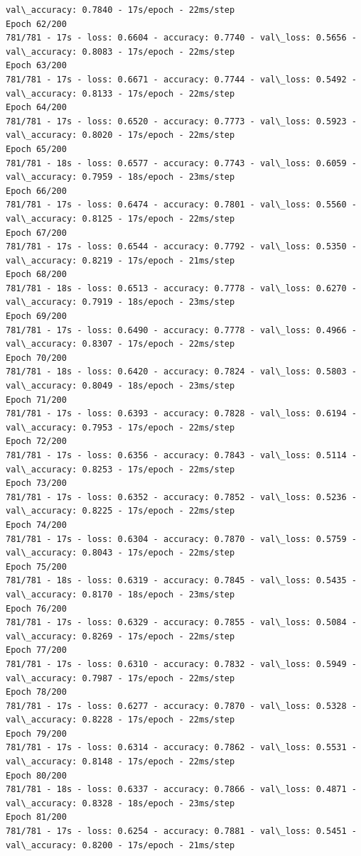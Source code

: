 \documentclass[11pt]{article}
\begin{document}
\begin{Verbatim}[commandchars=\\\{\}]
val\_accuracy: 0.7840 - 17s/epoch - 22ms/step
Epoch 62/200
781/781 - 17s - loss: 0.6604 - accuracy: 0.7740 - val\_loss: 0.5656 -
val\_accuracy: 0.8083 - 17s/epoch - 22ms/step
Epoch 63/200
781/781 - 17s - loss: 0.6671 - accuracy: 0.7744 - val\_loss: 0.5492 -
val\_accuracy: 0.8133 - 17s/epoch - 22ms/step
Epoch 64/200
781/781 - 17s - loss: 0.6520 - accuracy: 0.7773 - val\_loss: 0.5923 -
val\_accuracy: 0.8020 - 17s/epoch - 22ms/step
Epoch 65/200
781/781 - 18s - loss: 0.6577 - accuracy: 0.7743 - val\_loss: 0.6059 -
val\_accuracy: 0.7959 - 18s/epoch - 23ms/step
Epoch 66/200
781/781 - 17s - loss: 0.6474 - accuracy: 0.7801 - val\_loss: 0.5560 -
val\_accuracy: 0.8125 - 17s/epoch - 22ms/step
Epoch 67/200
781/781 - 17s - loss: 0.6544 - accuracy: 0.7792 - val\_loss: 0.5350 -
val\_accuracy: 0.8219 - 17s/epoch - 21ms/step
Epoch 68/200
781/781 - 18s - loss: 0.6513 - accuracy: 0.7778 - val\_loss: 0.6270 -
val\_accuracy: 0.7919 - 18s/epoch - 23ms/step
Epoch 69/200
781/781 - 17s - loss: 0.6490 - accuracy: 0.7778 - val\_loss: 0.4966 -
val\_accuracy: 0.8307 - 17s/epoch - 22ms/step
Epoch 70/200
781/781 - 18s - loss: 0.6420 - accuracy: 0.7824 - val\_loss: 0.5803 -
val\_accuracy: 0.8049 - 18s/epoch - 23ms/step
Epoch 71/200
781/781 - 17s - loss: 0.6393 - accuracy: 0.7828 - val\_loss: 0.6194 -
val\_accuracy: 0.7953 - 17s/epoch - 22ms/step
Epoch 72/200
781/781 - 17s - loss: 0.6356 - accuracy: 0.7843 - val\_loss: 0.5114 -
val\_accuracy: 0.8253 - 17s/epoch - 22ms/step
Epoch 73/200
781/781 - 17s - loss: 0.6352 - accuracy: 0.7852 - val\_loss: 0.5236 -
val\_accuracy: 0.8225 - 17s/epoch - 22ms/step
Epoch 74/200
781/781 - 17s - loss: 0.6304 - accuracy: 0.7870 - val\_loss: 0.5759 -
val\_accuracy: 0.8043 - 17s/epoch - 22ms/step
Epoch 75/200
781/781 - 18s - loss: 0.6319 - accuracy: 0.7845 - val\_loss: 0.5435 -
val\_accuracy: 0.8170 - 18s/epoch - 23ms/step
Epoch 76/200
781/781 - 17s - loss: 0.6329 - accuracy: 0.7855 - val\_loss: 0.5084 -
val\_accuracy: 0.8269 - 17s/epoch - 22ms/step
Epoch 77/200
781/781 - 17s - loss: 0.6310 - accuracy: 0.7832 - val\_loss: 0.5949 -
val\_accuracy: 0.7987 - 17s/epoch - 22ms/step
Epoch 78/200
781/781 - 17s - loss: 0.6277 - accuracy: 0.7870 - val\_loss: 0.5328 -
val\_accuracy: 0.8228 - 17s/epoch - 22ms/step
Epoch 79/200
781/781 - 17s - loss: 0.6314 - accuracy: 0.7862 - val\_loss: 0.5531 -
val\_accuracy: 0.8148 - 17s/epoch - 22ms/step
Epoch 80/200
781/781 - 18s - loss: 0.6337 - accuracy: 0.7866 - val\_loss: 0.4871 -
val\_accuracy: 0.8328 - 18s/epoch - 23ms/step
Epoch 81/200
781/781 - 17s - loss: 0.6254 - accuracy: 0.7881 - val\_loss: 0.5451 -
val\_accuracy: 0.8200 - 17s/epoch - 21ms/step

\end{Verbatim}
\end{document}
